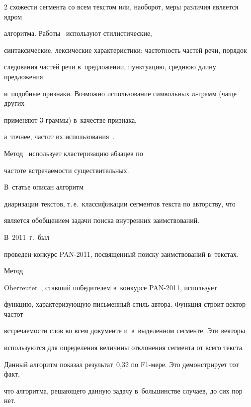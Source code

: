 \begin{multicols}{2}
схожести сегмента со всем текс\-том или, наоборот, меры различия является ядром 

алгоритма. Работы~\cite{Graz, Innsbruck, Weimar} используют стилистические, 

синтаксические, лексические характеристики: частотность частей речи, порядок 

следования частей речи в~предложении, пунктуацию, среднюю длину предложения 

и~подобные признаки. Возможно использование символьных $n$-грамм (чаще других 

применяют 3-грам\-мы) в~качестве признака, 

а~точнее, час\-тот их использования~\cite{Aegean, Valencia}. 



Метод~\cite{Surrey} использует кластеризацию абзацев по 

час\-то\-те встречаемости существительных. 



В~статье \cite{AP} описан алгоритм 

диаризации текстов, т.\,е.\ классификации сегментов текста по авторству, что 

является обобщением задачи поиска внутренних заимствований. 



В~2011~г.\ был 

проведен конкурс PAN-2011, посвященный поиску заимствований в~текстах. 

Метод 

Oberreuter~\cite{Chile}, ставший победителем в~конкурсе PAN-2011, использует 

функцию, характеризующую письменный стиль автора. Функция строит вектор час\-тот 

встречаемости слов во всем документе и~в~выделенном сегменте. Эти векторы 

используются для определения величины отклонения сегмента от всего текста. 

Данный алгоритм показал результат~0,32 по F1-ме\-ре. Это демонстрирует тот факт, 

что алгоритма, решающего данную задачу в~большинстве случаев, до сих пор нет.



\begin{figure}[b] %

    \vspace*{-3pt}

\begin{center}


\end{center}
\end{figure}
\end{multicols}
